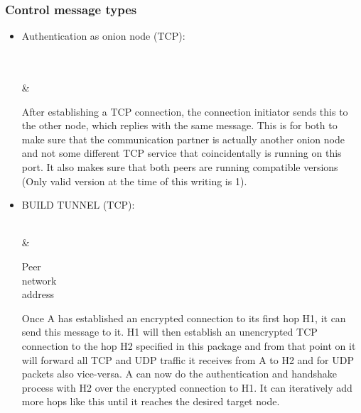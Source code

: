 \documentclass{article}
\begin{document}
\label{subsec:control_message_types}
\subsubsection{Control message types}
\begin{itemize}
	\item Authentication as onion node (TCP):
	
\begin{bytefield}[bitwidth=1.1em]{32}
	 \\
	 \\
	&  \\
\end{bytefield}
	
	After establishing a TCP connection, the connection initiator sends this to the other node, which replies with the same message. This is for both to make sure that the communication partner is actually another onion node and not some different TCP service that coincidentally is running on this port. It also makes sure that both peers are running compatible versions (Only valid version at the time of this writing is 1).
	
	\item BUILD TUNNEL (TCP): \\
	
	
\begin{bytefield}[bitwidth=2.2em]{16}
	 \\
		&  \\
\begin{rightwordgroup}{Peer\\ network\\ address}
		 \\
		\end{rightwordgroup}	
\end{bytefield}
Once A has established an encrypted connection to its first hop H1, it can send this message to it. H1 will then establish an unencrypted TCP connection to the hop H2 specified in this package and from that point on it will forward all TCP and UDP traffic it receives from A to H2 and for UDP packets also vice-versa. A can now do the authentication and handshake process with H2 over the encrypted connection to H1. It can iteratively add more hops like this until it reaches the desired target node.


\end{itemize}
\end{document}
